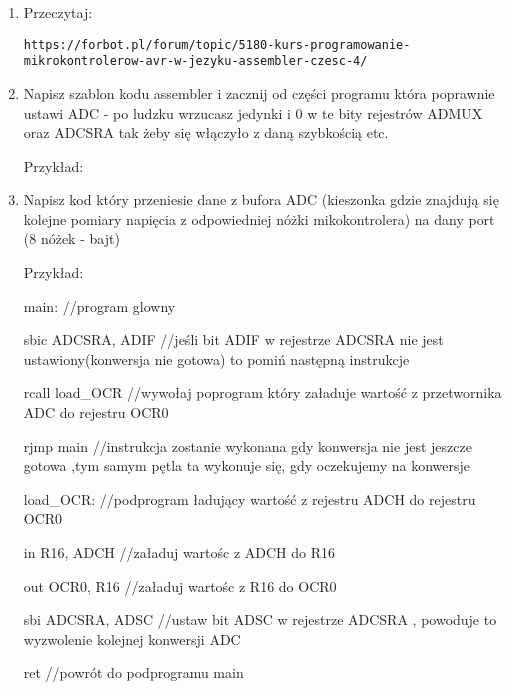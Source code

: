 \documentclass[13pt]{article}
\begin{document}
\begin{enumerate}
\item Przeczytaj:

\texttt{https://forbot.pl/forum/topic/5180-kurs-programowanie-mikrokontrolerow-avr-w-jezyku-assembler-czesc-4/}

\item Napisz szablon kodu assembler i zacznij od części programu która poprawnie ustawi ADC - po ludzku wrzucasz jedynki i 0 w te bity rejestrów ADMUX oraz ADCSRA tak żeby się włączyło z daną szybkością etc.

Przykład:

\item Napisz kod który przeniesie dane z bufora ADC (kieszonka gdzie znajdują się kolejne pomiary napięcia z odpowiedniej nóżki mikokontrolera) na dany port (8 nóżek - bajt) 

Przykład:



main: 					//program glowny

sbic ADCSRA, ADIF		//jeśli bit ADIF w rejestrze ADCSRA nie jest ustawiony(konwersja nie gotowa) to pomiń następną instrukcje

rcall load\_OCR			//wywołaj poprogram który załaduje wartość z przetwornika ADC do rejestru OCR0

rjmp main				//instrukcja zostanie wykonana gdy konwersja nie jest jeszcze gotowa ,tym samym pętla ta wykonuje się, gdy oczekujemy na konwersje



load\_OCR:				//podprogram ładujący wartość z rejestru ADCH do rejestru OCR0

in R16, ADCH			//załaduj wartośc z ADCH do R16

out OCR0, R16			//załaduj wartośc z R16 do OCR0

sbi ADCSRA, ADSC		//ustaw bit ADSC w rejestrze ADCSRA , powoduje to wyzwolenie kolejnej konwersji ADC

ret						//powrót do podprogramu main

\end{enumerate}
\end{document}
